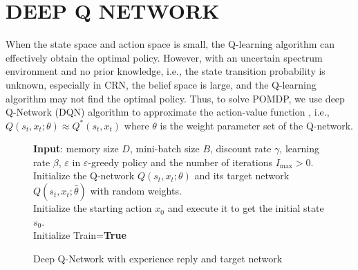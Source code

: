 \documentclass[journal]{IEEEtran}
\makeatletter
\newcommand{\removelatexerror}{\let\@latex@error\@gobble}
\makeatother
\begin{document}
	\section{DEEP Q NETWORK}
		When the state space and action space is small, the Q-learning algorithm can effectively obtain the optimal policy. However, with an uncertain spectrum environment and no prior knowledge, i.e., the state transition probability is unknown, especially in CRN, the belief space is large, and the Q-learning algorithm may not find the optimal policy. Thus, to solve POMDP, we use deep Q-Network (DQN) algorithm  to approximate the action-value function \cite{Deep_25}, i.e.,
		$Q({s_t},{x_t};\theta ) \approx {Q^*}({s_t},{x_t})$ where $\theta$ is the weight parameter set of the Q-network.
		
		\begin{figure}[!t]
			\label{Algorithm1}
			\removelatexerror
			\begin{algorithm}[H]
				\SetAlgoLined
				\caption{Deep Q-Network with experience reply and target network}
				\textbf{Input}: memory size $D$, mini-batch size $B$, discount rate $\gamma$, learning rate $\beta$, $\varepsilon$ in $\varepsilon$-greedy policy and the number of iterations $I_{\text{max}} > 0$.\\
				Initialize the Q-network $Q({s_t},{x_t};\theta )$ and its target network $Q({s_t},{x_t};\hat \theta )$ with random weights.\\
				Initialize the starting action $x_0$ and execute it to get the initial state $s_0$.\\
				Initialize Train=\textbf{True}\\
			\end{algorithm}
		\end{figure}
		
\end{document}
